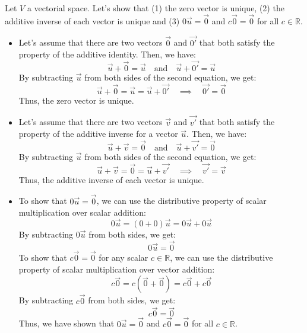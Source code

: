 \begin{eg}
    Let $V$ a vectorial space. Let's show that (1) the zero vector is unique, (2) the additive inverse of each vector is unique and (3) $0 \vec{u} = \vec{0}$ and $c \vec{0} = \vec{0}$ for all $c \in \mathbb{R}$.
    \begin{itemize}[itemsep=1pt,label=$\circ$]
        \item Let's assume that there are two vectors $\vec{0}$ and $\vec{0'}$ that both satisfy the property of the additive identity. Then, we have:
        \[\vec{u} + \vec{0} = \vec{u} \quad \text{and} \quad \vec{u} + \vec{0'} = \vec{u}\]
        By subtracting $\vec{u}$ from both sides of the second equation, we get:
        \[ \vec{u} + \vec{0} = \vec{u} = \vec{u} + \vec{0'} \quad \implies \quad \vec{0'} = \vec{0}\]
        Thus, the zero vector is unique.
        \item Let's assume that there are two vectors $\vec{v}$ and $\vec{v'}$ that both satisfy the property of the additive inverse for a vector $\vec{u}$. Then, we have:
        \[\vec{u} + \vec{v} = \vec{0} \quad \text{and} \quad \vec{u} + \vec{v'} = \vec{0}\]
        By subtracting $\vec{u}$ from both sides of the second equation, we get:
        \[ \vec{u} + \vec{v} = \vec{0} = \vec{u} + \vec{v'} \quad \implies \quad \vec{v'} = \vec{v}\]
        Thus, the additive inverse of each vector is unique.
        \item To show that $0 \vec{u} = \vec{0}$, we can use the distributive property of scalar multiplication over scalar addition:
        \[0 \vec{u} = (0 + 0) \vec{u} = 0 \vec{u} + 0 \vec{u}\]
        By subtracting $0 \vec{u}$ from both sides, we get:
        \[0 \vec{u} = \vec{0}\]
        To show that $c \vec{0} = \vec{0}$ for any scalar $c \in \mathbb{R}$, we can use the distributive property of scalar multiplication over vector addition:
        \[c \vec{0} = c (\vec{0} + \vec{0}) = c \vec{0} + c \vec{0}\]
        By subtracting $c \vec{0}$ from both sides, we get:
        \[c \vec{0} = \vec{0}\]
        Thus, we have shown that $0 \vec{u} = \vec{0}$ and $c \vec{0} = \vec{0}$ for all $c \in \mathbb{R}$.
    \end{itemize}
\end{eg}

